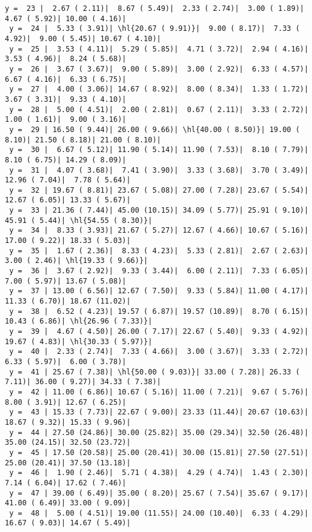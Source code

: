 \documentclass[10pt]{article}
\newcommand{\hl}[1]{\textbf{\textcolor{red}{#1}}}
\begin{document}
\begin{Verbatim}[fontsize=\small, commandchars=\\\{\}]
 y =  23 |  2.67 ( 2.11)|  8.67 ( 5.49)|  2.33 ( 2.74)|  3.00 ( 1.89)|  4.67 ( 5.92)| 10.00 ( 4.16)|
 y =  24 |  5.33 ( 3.91)| \hl{20.67 ( 9.91)}|  9.00 ( 8.17)|  7.33 ( 4.92)|  9.00 ( 5.45)| 10.67 ( 4.10)|
 y =  25 |  3.53 ( 4.11)|  5.29 ( 5.85)|  4.71 ( 3.72)|  2.94 ( 4.16)|  3.53 ( 4.96)|  8.24 ( 5.68)|
 y =  26 |  3.67 ( 3.67)|  9.00 ( 5.89)|  3.00 ( 2.92)|  6.33 ( 4.57)|  6.67 ( 4.16)|  6.33 ( 6.75)|
 y =  27 |  4.00 ( 3.06)| 14.67 ( 8.92)|  8.00 ( 8.34)|  1.33 ( 1.72)|  3.67 ( 3.31)|  9.33 ( 4.10)|
 y =  28 |  5.00 ( 4.51)|  2.00 ( 2.81)|  0.67 ( 2.11)|  3.33 ( 2.72)|  1.00 ( 1.61)|  9.00 ( 3.16)|
 y =  29 | 16.50 ( 9.44)| 26.00 ( 9.66)| \hl{40.00 ( 8.50)}| 19.00 ( 8.10)| 21.50 ( 8.18)| 21.00 ( 8.10)|
 y =  30 |  6.67 ( 5.12)| 11.90 ( 5.14)| 11.90 ( 7.53)|  8.10 ( 7.79)|  8.10 ( 6.75)| 14.29 ( 8.09)|
 y =  31 |  4.07 ( 3.68)|  7.41 ( 3.90)|  3.33 ( 3.68)|  3.70 ( 3.49)| 12.96 ( 7.04)|  7.78 ( 5.64)|
 y =  32 | 19.67 ( 8.81)| 23.67 ( 5.08)| 27.00 ( 7.28)| 23.67 ( 5.54)| 12.67 ( 6.05)| 13.33 ( 5.67)|
 y =  33 | 21.36 ( 7.44)| 45.00 (10.15)| 34.09 ( 5.77)| 25.91 ( 9.10)| 45.91 ( 5.44)| \hl{54.55 ( 8.30)}|
 y =  34 |  8.33 ( 3.93)| 21.67 ( 5.27)| 12.67 ( 4.66)| 10.67 ( 5.16)| 17.00 ( 9.22)| 18.33 ( 5.03)|
 y =  35 |  1.67 ( 2.36)|  8.33 ( 4.23)|  5.33 ( 2.81)|  2.67 ( 2.63)|  3.00 ( 2.46)| \hl{19.33 ( 9.66)}|
 y =  36 |  3.67 ( 2.92)|  9.33 ( 3.44)|  6.00 ( 2.11)|  7.33 ( 6.05)|  7.00 ( 5.97)| 13.67 ( 5.08)|
 y =  37 | 13.00 ( 6.56)| 12.67 ( 7.50)|  9.33 ( 5.84)| 11.00 ( 4.17)| 11.33 ( 6.70)| 18.67 (11.02)|
 y =  38 |  6.52 ( 4.23)| 19.57 ( 6.87)| 19.57 (10.89)|  8.70 ( 6.15)| 10.43 ( 6.86)| \hl{26.96 ( 7.33)}|
 y =  39 |  4.67 ( 4.50)| 26.00 ( 7.17)| 22.67 ( 5.40)|  9.33 ( 4.92)| 19.67 ( 4.83)| \hl{30.33 ( 5.97)}|
 y =  40 |  2.33 ( 2.74)|  7.33 ( 4.66)|  3.00 ( 3.67)|  3.33 ( 2.72)|  6.33 ( 5.97)|  6.00 ( 3.78)|
 y =  41 | 25.67 ( 7.38)| \hl{50.00 ( 9.03)}| 33.00 ( 7.28)| 26.33 ( 7.11)| 36.00 ( 9.27)| 34.33 ( 7.38)|
 y =  42 | 11.00 ( 6.86)| 10.67 ( 5.16)| 11.00 ( 7.21)|  9.67 ( 5.76)|  8.00 ( 3.91)| 12.67 ( 6.25)|
 y =  43 | 15.33 ( 7.73)| 22.67 ( 9.00)| 23.33 (11.44)| 20.67 (10.63)| 18.67 ( 9.32)| 15.33 ( 9.96)|
 y =  44 | 27.50 (24.86)| 30.00 (25.82)| 35.00 (29.34)| 32.50 (26.48)| 35.00 (24.15)| 32.50 (23.72)|
 y =  45 | 17.50 (20.58)| 25.00 (20.41)| 30.00 (15.81)| 27.50 (27.51)| 25.00 (20.41)| 37.50 (13.18)|
 y =  46 |  1.90 ( 2.46)|  5.71 ( 4.38)|  4.29 ( 4.74)|  1.43 ( 2.30)|  7.14 ( 6.04)| 17.62 ( 7.46)|
 y =  47 | 39.00 ( 6.49)| 35.00 ( 8.20)| 25.67 ( 7.54)| 35.67 ( 9.17)| 41.00 ( 6.49)| 33.00 ( 9.09)|
 y =  48 |  5.00 ( 4.51)| 19.00 (11.55)| 24.00 (10.40)|  6.33 ( 4.29)| 16.67 ( 9.03)| 14.67 ( 5.49)|

\end{Verbatim}
\end{document}
